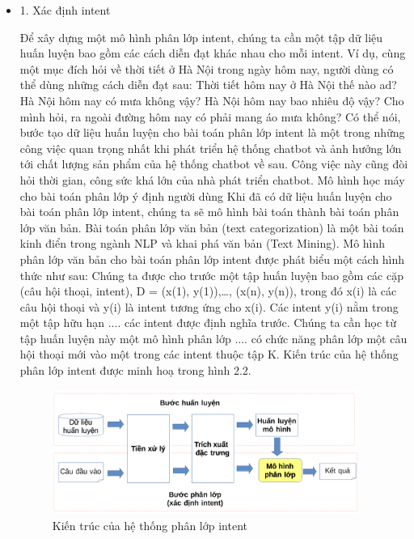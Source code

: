 \begin{itemize}
    \item 1. Xác định intent

          Để xây dựng một mô hình phân lớp intent, chúng ta cần một tập dữ liệu huấn luyện bao gồm các cách diễn đạt khác nhau cho mỗi intent. Ví dụ, cùng một mục đích hỏi về thời tiết ở Hà Nội trong ngày hôm nay, người dùng có thể dùng những cách diễn đạt sau:
          Thời tiết hôm nay ở Hà Nội thế nào ad?
          Hà Nội hôm nay có mưa không vậy?
          Hà Nội hôm nay bao nhiêu độ vậy?
          Cho mình hỏi, ra ngoài đường hôm nay có phải mang áo mưa không?
          Có thể nói, bước tạo dữ liệu huấn luyện cho bài toán phân lớp intent là một trong những công việc quan trọng nhất khi phát triển hệ thống chatbot và ảnh hưởng lớn tới chất lượng sản phẩm của hệ thống chatbot về sau. Công việc này cũng đòi hỏi thời gian, công sức khá lớn của nhà phát triển chatbot.
          Mô hình học máy cho bài toán phân lớp ý định người dùng
          Khi đã có dữ liệu huấn luyện cho bài toán phân lớp intent, chúng ta sẽ mô hình bài toán thành bài toán phân lớp văn bản. Bài toán phân lớp văn bản (text categorization) là một bài toán kinh điển trong ngành NLP và khai phá văn bản (Text Mining). Mô hình phân lớp văn bản cho bài toán phân lớp intent được phát biểu một cách hình thức như sau:
          Chúng ta được cho trước một tập huấn luyện bao gồm các cặp (câu hội thoại, intent), D = {(x(1), y(1)),…, (x(n), y(n))}, trong đó x(i) là các câu hội thoại và y(i) là intent tương ứng cho x(i). Các intent y(i) nằm trong một tập hữu hạn .... các intent được định nghĩa trước. Chúng ta cần học từ tập huấn luyện này một mô hình phân lớp .... có chức năng phân lớp một câu hội thoại mới vào một trong các intent thuộc tập K. Kiến trúc của hệ thống phân lớp intent được minh hoạ trong hình 2.2.
          \begin{figure}[htp]
              \centering
              \includegraphics[width=10cm]{images/structure-system-class-intent.png}
              \caption{Kiến trúc của hệ thống phân lớp intent}
              \label{fig:system-class-intent}
          \end{figure}

\end{itemize}
